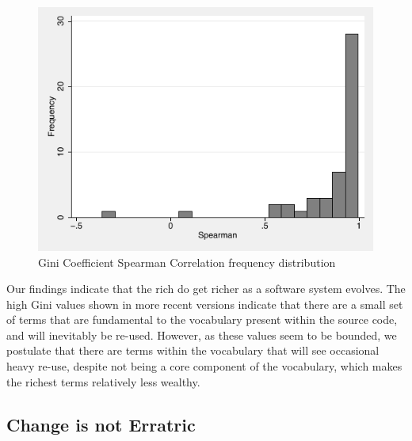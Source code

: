 \begin{figure}[t]
\centering
\includegraphics[width=\textwidth]{Figures/Vocab-GiniSpearmanFreqDist.pdf}
\caption{Gini Coefficient Spearman Correlation frequency distribution}
\label{fig:vocab-gini-spearman}
\end{figure}


Our findings indicate that the rich do get richer as a software system evolves. The high Gini values shown in more recent versions indicate that there are a small set of terms that are fundamental to the vocabulary present within the source code, and will inevitably be re-used. However, as these values seem to be bounded, we postulate that there are terms within the vocabulary that will see occasional heavy re-use, despite not being a core component of the vocabulary, which makes the richest terms relatively less wealthy.


\subsection{Change is not Erratric} %
\label{sub:change_is_not_erratric}

